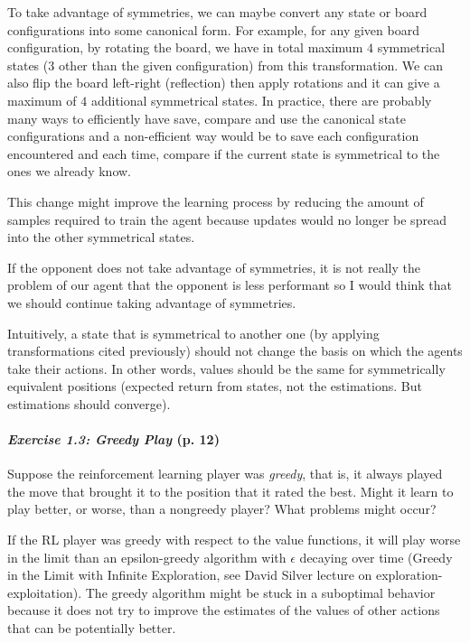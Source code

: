 \documentclass[10pt,a4paper]{article}
\begin{document}
\bigskip
To take advantage of symmetries, we can maybe convert any state or board configurations into some canonical form. For example, for any given board configuration, by rotating the board, we have in total maximum $4$ symmetrical states ($3$ other than the given configuration) from this transformation. We can also flip the board left-right (reflection) then apply rotations and it can give a maximum of $4$ additional symmetrical states. In practice, there are probably many ways to efficiently have save, compare and use the canonical state configurations and a non-efficient way would be to save each configuration encountered and each time, compare if the current state is symmetrical to the ones we already know.

This change might improve the learning process by reducing the amount of samples required to train the agent because updates would no longer be spread into the other symmetrical states.

If the opponent does not take advantage of symmetries, it is not really the problem of our agent that the opponent is less performant so I would think that we should continue taking advantage of symmetries.

Intuitively, a state that is symmetrical to another one (by applying transformations cited previously) should not change the basis on which the agents take their actions. In other words, values should be the same for symmetrically equivalent positions (expected return from states, not the estimations. But estimations should converge).


\paragraph{\textit{Exercise 1.3: Greedy Play} (p. 12)} Suppose the reinforcement learning player was \textit{greedy}, that is, it always played the move that brought it to the position that it rated the best. Might it learn to play better, or worse, than a nongreedy player? What problems might occur?

\bigskip
If the RL player was greedy with respect to the value functions, it will play worse in the limit than an epsilon-greedy algorithm with $\epsilon$ decaying over time (Greedy in the Limit with Infinite Exploration, see David Silver lecture on exploration-exploitation). The greedy algorithm might be stuck in a suboptimal behavior because it does not try to improve the estimates of the values of other actions that can be potentially better.
\end{document}

